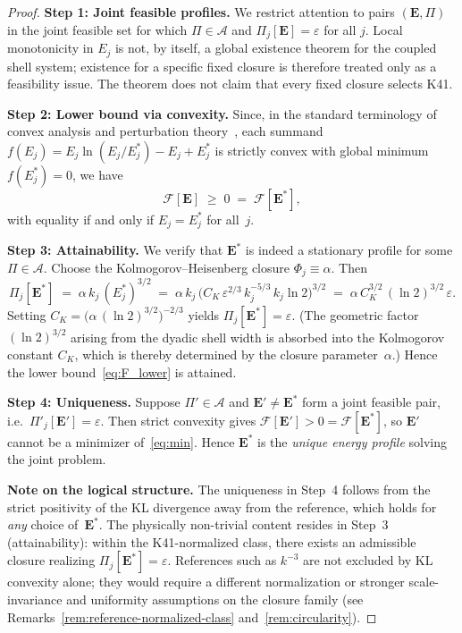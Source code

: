 \documentclass[12pt,a4paper]{article}
\theoremstyle{definition}
\theoremstyle{plain}
\theoremstyle{remark}
\begin{document}
\begin{proof}
\textbf{Step 1: Joint feasible profiles.}\;
We restrict attention to pairs $(\mathbf{E},\Pi)$ in the joint feasible set
for which $\Pi\in\mathscr{A}$ and $\Pi_j[\mathbf{E}]=\varepsilon$ for all
$j$.  Local monotonicity in $E_j$ is not, by itself, a global existence
theorem for the coupled shell system; existence for a specific fixed
closure is therefore treated only as a feasibility issue.  The theorem
does not claim that every fixed closure selects K41.

\textbf{Step 2: Lower bound via convexity.}\;
Since, in the standard terminology of convex analysis and perturbation theory~\cite{Rockafellar70,BonnansShapiro00}, each summand $f(E_j) = E_j\ln(E_j/E_j^*) - E_j + E_j^*$ is
strictly convex with global minimum $f(E_j^*) = 0$, we have
\begin{equation}\label{eq:F_lower}
  \mathcal{F}[\mathbf{E}]
  \;\ge\; 0
  \;=\; \mathcal{F}[\mathbf{E}^*],
\end{equation}
with equality if and only if $E_j = E_j^*$ for all~$j$.

\textbf{Step 3: Attainability.}\;
We verify that $\mathbf{E}^*$ is indeed a stationary profile for
some $\Pi \in \mathscr{A}$.  Choose the Kolmogorov--Heisenberg closure
$\Phi_j \equiv \alpha$.  Then
\[
  \Pi_j[\mathbf{E}^*]
  \;=\; \alpha\,k_j\,(E_j^*)^{3/2}
  \;=\; \alpha\,k_j\,
    \bigl(C_K\,\varepsilon^{2/3}\,k_j^{-5/3}\,k_j\ln 2\bigr)^{3/2}
  \;=\; \alpha\,C_K^{3/2}\,(\ln 2)^{3/2}\,\varepsilon.
\]
Setting $C_K = \bigl(\alpha\,(\ln 2)^{3/2}\bigr)^{-2/3}$ yields
$\Pi_j[\mathbf{E}^*] = \varepsilon$.  (The geometric factor $(\ln 2)^{3/2}$
arising from the dyadic shell width is absorbed into the Kolmogorov
constant $C_K$, which is thereby determined by the closure
parameter~$\alpha$.)  Hence the lower bound~\eqref{eq:F_lower} is
attained.

\textbf{Step 4: Uniqueness.}\;
Suppose $\Pi' \in \mathscr{A}$ and $\mathbf{E}' \ne \mathbf{E}^*$ form a
joint feasible pair, i.e.\ $\Pi'_j[\mathbf{E}'] = \varepsilon$.  Then strict convexity gives
$\mathcal{F}[\mathbf{E}'] > 0 = \mathcal{F}[\mathbf{E}^*]$, so $\mathbf{E}'$
cannot be a minimizer of~\eqref{eq:min}.  Hence $\mathbf{E}^*$ is the
\emph{unique energy profile} solving the joint problem.

\smallskip\noindent
\textbf{Note on the logical structure.}\;
The uniqueness in Step~4 follows from the strict positivity of the KL
divergence away from the reference, which holds for \emph{any} choice
of~$\mathbf{E}^*$. The physically non-trivial content resides in
Step~3 (attainability): within the K41-normalized class, there exists an
admissible closure realizing $\Pi_j[\mathbf{E}^*] = \varepsilon$.
References such as $k^{-3}$ are not excluded by KL convexity alone; they
would require a different normalization or stronger scale-invariance and
uniformity assumptions on the closure family (see
Remarks~\ref{rem:reference-normalized-class} and~\ref{rem:circularity}).


\end{proof}
\end{document}
